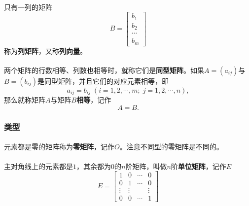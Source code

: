 \paragraph{}
只有一列的矩阵
\begin{equation*}
  B = \left[\begin{array}{c}
    b_1 \\
    b_2 \\
    \cdots \\
    b_m
  \end{array}\right]
\end{equation*}
称为\textbf{列矩阵}，又称\textbf{列向量}。

\paragraph{}
两个矩阵的行数相等、列数也相等时，就称它们是\textbf{同型矩阵}。如果$A=(a_{ij})$与$B=(b_{ij})$是同型矩阵，并且它们的对应元素相等，即
\begin{equation*}
  a_{ij}=b_{ij} \;(i=1,2,\cdots,m; \; j=1,2,\cdots,n),
\end{equation*}
那么就称矩阵$A$与矩阵$B$\textbf{相等}，记作
\begin{equation*}
  A=B.
\end{equation*}

\subsubsection{类型}
\paragraph{}
元素都是零的矩阵称为\textbf{零矩阵}，记作$O$。注意不同型的零矩阵是不同的。

\paragraph{}
主对角线上的元素都是$1$，其余都为$0$的$n$阶矩阵，叫做$n$阶\textbf{单位矩阵}，记作$E$
\begin{equation*}
  E = \left[\begin{array}{cccc}
    1 & 0 & \cdots & 0 \\
    0 & 1 & \cdots & 0 \\
    \vdots & \vdots & & \vdots \\
    0 & 0 & \cdots & 1
  \end{array}\right]
\end{equation*}

